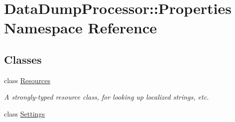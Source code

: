 \hypertarget{namespace_data_dump_processor_1_1_properties}{
\section{Data\-Dump\-Processor::Properties Namespace Reference}
\label{namespace_data_dump_processor_1_1_properties}
}


\subsection*{Classes}
\begin{CompactItemize}
\item 
class \hyperlink{class_data_dump_processor_1_1_properties_1_1_resources}{Resources}
\begin{CompactList}\small\item\em A strongly-typed resource class, for looking up localized strings, etc. \item\end{CompactList}\item 
class \hyperlink{class_data_dump_processor_1_1_properties_1_1_settings}{Settings}
\end{CompactItemize}
